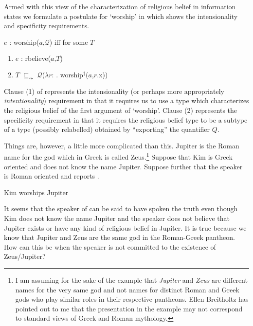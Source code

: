 Armed with this view of the characterization of religious belief in
information states we formulate a postulate for `worship' in \nexteg{}
which
shows the intensionality and specificity requirements.
\begin{ex} 
$e$ : worship($a$,$\mathcal{Q}$) iff for some $T$
\begin{enumerate} 
 
\item $e$ : rbelieve($a$,$T$) 
 
\item $T$ $\sqsubseteq_{\leadsto}$ $\mathcal{Q}$($\lambda
  r$: . worship$^\dagger$($a$,$r$.x))
 
\end{enumerate} 
   
\end{ex} 
Clause (1) of \preveg{} represents the intensionality (or perhaps more
appropriately \textit{intentionality}) requirement in that it requires
us to use a type which characterizes the religious belief of the
first argument of `worship'.  Clause (2) represents the specificity
requirement in that it requires the religious belief type to be a
subtype of a type (possibly relabelled) obtained by ``exporting'' the quantifier $Q$.

Things are, however, a little more complicated than this.  Jupiter is
the Roman name for the god which in Greek is called Zeus.\footnote{I
  am assuming for the sake of the example that \textit{Jupiter} and
  \textit{Zeus} are different names for the very same god and not
  names for distinct Roman and Greek gods who play similar roles in
  their respective pantheons.  Ellen Breitholtz has pointed out to me
  that the presentation in the example may not correspond to standard
  views of Greek and Roman mythology.}  Suppose
that Kim is Greek oriented and does not know the name Jupiter.
Suppose further that the speaker is Roman oriented and reports
\nexteg{}.
\begin{ex} 
Kim worships Jupiter 
\end{ex} 
It seems that the speaker of \preveg{} can be said to have spoken the truth even
though Kim does not know the name Jupiter and the speaker does not
believe that Jupiter exists or have any kind of religious belief in
Jupiter.  It is true because we know that Jupiter and Zeus are the same
god in the Roman-Greek pantheon.   How can this be when the speaker is
not committed to the existence of Zeus/Jupiter?


